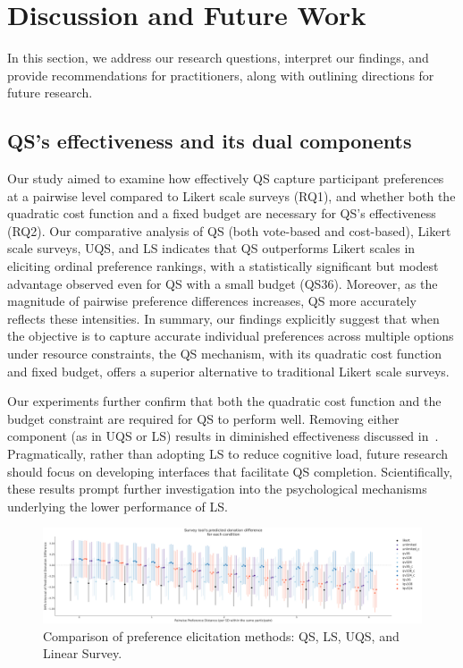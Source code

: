 \section{Discussion and Future Work}
\label{sec:discussion}
In this section, we address our research questions, interpret our findings, and provide recommendations for practitioners, along with outlining directions for future research.

\subsection{QS's effectiveness and its dual components}
Our study aimed to examine how effectively QS capture participant preferences at a pairwise level compared to Likert scale surveys (RQ1), and whether both the quadratic cost function and a fixed budget are necessary for QS's effectiveness (RQ2). Our comparative analysis of QS (both vote-based and cost-based), Likert scale surveys, UQS, and LS indicates that QS outperforms Likert scales in eliciting ordinal preference rankings, with a statistically significant but modest advantage observed even for QS with a small budget (QS36). Moreover, as the magnitude of pairwise preference differences increases, QS more accurately reflects these intensities. In summary, our findings explicitly suggest that when the objective is to capture accurate individual preferences across multiple options under resource constraints, the QS mechanism, with its quadratic cost function and fixed budget, offers a superior alternative to traditional Likert scale surveys.

Our experiments further confirm that both the quadratic cost function and the budget constraint are required for QS to perform well. Removing either component (as in UQS or LS) results in diminished effectiveness discussed in~. Pragmatically, rather than adopting LS to reduce cognitive load, future research should focus on developing interfaces that facilitate QS completion. Scientifically, these results prompt further investigation into the psychological mechanisms underlying the lower performance of LS.

\begin{figure}[h]
    \centering
    \includegraphics[width=\textwidth]{content/image/Predicted_Donation_Diff_Interval.pdf}
    \caption{Comparison of preference elicitation methods: QS, LS, UQS, and Linear Survey.}
    \label{fig:comparison}
\end{figure}


